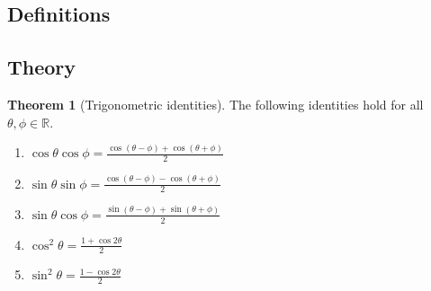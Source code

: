 \documentclass[11pt]{article}
\theoremstyle{definition}
\theoremstyle{named}
\newtheorem*{namedtheorem}{Theorem}
\numberwithin{myalgctr}{section}
\begin{document}
\thispagestyle{fancy}
\subsection*{Definitions}


\subsection*{Theory}
\begin{namedtheorem}[Trigonometric identities] The following identities hold for all $\theta, \phi\in\mathbb{R}$.
  \begin{multicols}{2}
    \begin{enumerate}
      \item $\displaystyle\cos\theta\cos\phi=\frac{\cos(\theta-\phi)+\cos(\theta+\phi)}{2}$
      \item $\displaystyle\sin\theta\sin\phi=\frac{\cos(\theta-\phi)-\cos(\theta+\phi)}{2}$
      \item $\displaystyle\sin\theta\cos\phi= \frac{\sin(\theta-\phi)+\sin(\theta+\phi)}{2}$
      \item $\displaystyle\cos^2\theta=\frac{1+\cos2\theta}{2}$
      \item $\displaystyle\sin^2\theta=\frac{1-\cos2\theta}{2}$
    \end{enumerate}
  \end{multicols}

\end{namedtheorem}


\end{document}
